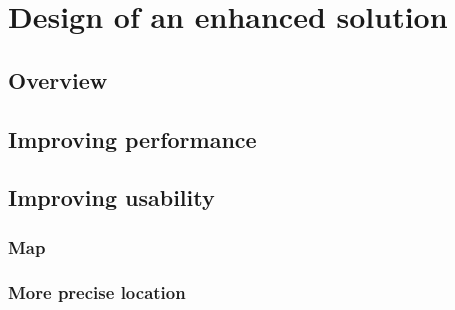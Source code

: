 \chapter{Design of an enhanced solution}
\label{chap:design}
\section{Overview}
\section{Improving performance}
\section{Improving usability}
\subsection{Map}
\subsection{More precise location}
